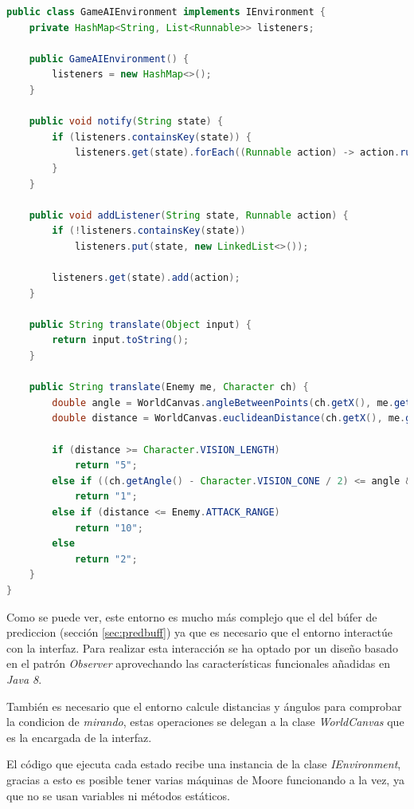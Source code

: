 \documentclass{pre-tfg}
\begin{document}
\begin{lstlisting}[caption=GameIA.moo, label=lst:gameiamooma, language=Java]
public class GameAIEnvironment implements IEnvironment {
    private HashMap<String, List<Runnable>> listeners;
    
    public GameAIEnvironment() {
        listeners = new HashMap<>();
    }
    
    public void notify(String state) {
        if (listeners.containsKey(state)) {
            listeners.get(state).forEach((Runnable action) -> action.run());
        }
    }
    
    public void addListener(String state, Runnable action) {
        if (!listeners.containsKey(state))
            listeners.put(state, new LinkedList<>());
        
        listeners.get(state).add(action);
    }
    
    public String translate(Object input) {
        return input.toString();
    }
    
    public String translate(Enemy me, Character ch) {
        double angle = WorldCanvas.angleBetweenPoints(ch.getX(), me.getX(), ch.getY(), me.getY()) * -1;
        double distance = WorldCanvas.euclideanDistance(ch.getX(), me.getX(), ch.getY(), me.getY());
        
        if (distance >= Character.VISION_LENGTH)
            return "5";
        else if ((ch.getAngle() - Character.VISION_CONE / 2) <= angle && (ch.getAngle() + Character.VISION_CONE / 2) >= angle)
            return "1";
        else if (distance <= Enemy.ATTACK_RANGE)
            return "10";
        else
            return "2";
    }
}
\end{lstlisting}

Como se puede ver, este entorno es mucho más complejo que el del búfer de prediccion (sección  \ref{sec:predbuff}) ya que es necesario que el entorno interactúe con la interfaz. Para realizar esta interacción se ha optado por un diseño basado en el patrón \emph{Observer} aprovechando las características funcionales añadidas en \emph{Java 8}.

También es necesario que el entorno calcule distancias y ángulos para comprobar la condicion de \emph{mirando}, estas operaciones se delegan a la clase \emph{WorldCanvas} que es la encargada de la interfaz.

El código que ejecuta cada estado recibe una instancia de la clase \emph{IEnvironment}, gracias a esto es posible tener varias máquinas de Moore funcionando a la vez, ya que no se usan variables ni métodos estáticos.
\end{document}

